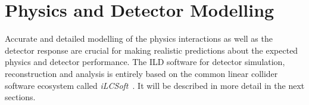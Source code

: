 %
%

\newcommand{\CPP}{C\nolinebreak\hspace{-.05em}\raisebox{.4ex}{\tiny\bf +}\nolinebreak\hspace{-.10em}\raisebox{.4ex}{\tiny\bf +}}


\chapter{ \label{chap:modelling} Physics and Detector Modelling}
\label{chap:modelling}

Accurate and detailed modelling of the physics interactions as well as the detector
response are crucial for making realistic predictions about the expected physics and detector
performance. The ILD software for detector simulation, reconstruction and analysis is entirely
based on the common linear collider software ecosystem called \emph{iLCSoft}~\cite{bib:ilcsoft}.
It will be described in more detail in the next sections.

